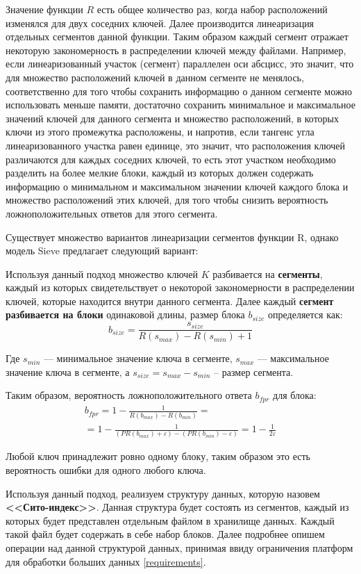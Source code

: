 Значение функции $R$ есть общее количество раз, когда набор расположений изменялся для двух соседних ключей. Далее производится линеаризация отдельных сегментов данной функции. Таким образом каждый сегмент отражает некоторую закономерность в распределении ключей между файлами. Например, если линеаризованный участок (сегмент) параллелен оси абсцисс, это значит, что для множество расположений ключей в данном сегменте не менялось, соответственно для того чтобы сохранить информацию о данном сегменте можно использовать меньше памяти, достаточно сохранить минимальное и максимальное значений ключей для данного сегмента и множество расположений, в которых ключи из этого промежутка расположены, и напротив, если тангенс угла линеаризованного участка равен единице, это значит, что расположения ключей различаются для каждых соседних ключей, то есть этот участком необходимо разделить на более мелкие блоки, каждый из которых должен содержать информацию о минимальном и максимальном значении ключей каждого блока и множество расположений этих ключей, для того чтобы снизить вероятность ложноположительных ответов для этого сегмента.

Существует множество вариантов линеаризации сегментов функции R, однако модель Sieve предлагает следующий вариант: 

Используя данный подход множество ключей $K$ разбивается на \textbf{сегменты}, каждый из которых свидетельствует о некоторой закономерности в распределении ключей, которые находится внутри данного сегмента. Далее каждый \textbf{сегмент разбивается на блоки} одинаковой длины, размер блока $b_{size}$ определяется как:
\begin{equation}\label{partition_size}
    b_{size} = \frac{s_{size}}{R(s_{max}) - R(s_{min}) + 1}
\end{equation}

Где $s_{min}$ --- минимальное значение ключа в сегменте, $s_{max}$ --- максимальное значение ключа в сегменте, а $s_{size} = s_{max} - s_{min}$ -- размер сегмента.

Таким образом, вероятность ложноположительного ответа $b_{fpr}$ для блока:
\begin{equation}\label{partition_fpr}
    \begin{gathered}
    b_{fpr} = 1 - \frac{1}{R(b_{max}) - R(b_{min})} =\\
    = 1 - \frac{1}{(PR(b_{max}) + \varepsilon) - (PR(b_{min}) - \varepsilon)} = 1 - \frac{1}{2\varepsilon}
    \end{gathered}
\end{equation}

Любой ключ принадлежит ровно одному блоку, таким образом это есть вероятность ошибки для одного любого ключа.

Используя данный подход, реализуем структуру данных, которую назовем \textbf{<<Сито-индекс>>}. Данная структура будет состоять из сегментов, каждый из которых будет представлен отдельным файлом в хранилище данных. Каждый такой файл будет содержать в себе набор блоков. Далее подробнее опишем операции над данной структурой данных, принимая ввиду ограничения платформ для обработки больших данных \ref{requirements}.

